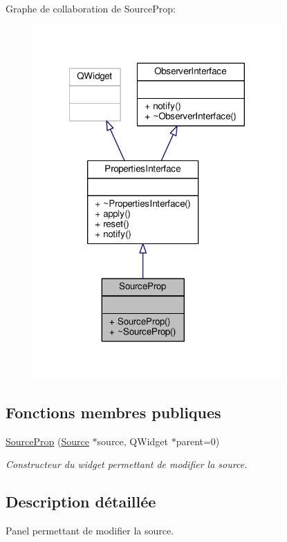 Graphe de collaboration de Source\+Prop\+:
\nopagebreak
\begin{figure}[H]
\begin{center}
\leavevmode
\includegraphics[width=269pt]{d0/d35/classSourceProp__coll__graph}
\end{center}
\end{figure}
\subsection*{Fonctions membres publiques}
\begin{DoxyCompactItemize}
\item 
\hyperlink{classSourceProp_ae2499296312b5f80c8dac887fa36008e}{Source\+Prop} (\hyperlink{classSource}{Source} $\ast$source, Q\+Widget $\ast$parent=0)
\begin{DoxyCompactList}\small\item\em Constructeur du widget permettant de modifier la source. \end{DoxyCompactList}\end{DoxyCompactItemize}


\subsection{Description détaillée}
Panel permettant de modifier la source. 

